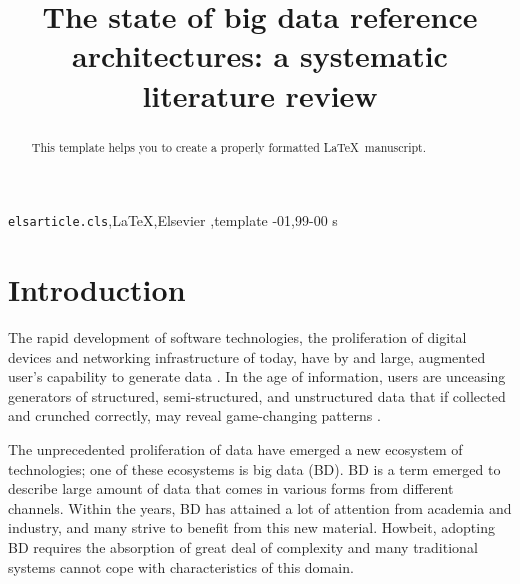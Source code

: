 \documentclass[review]{elsarticle}
\begin{document}
\begin{frontmatter}

\title{The state of big data reference architectures: a systematic literature review}





\begin{abstract}
This template helps you to create a properly formatted \LaTeX\ manuscript.
\end{abstract}

\begin{keyword}
\texttt{elsarticle.cls}\sep \LaTeX\sep Elsevier \sep template
-01\sep  99-00 s
\end{keyword}

\end{frontmatter}

\linenumbers

\section{Introduction}

The rapid development of software technologies, the proliferation of digital devices and networking infrastructure of today, have by and large, augmented user’s capability to generate data \cite{AtaeiSecurity}. In the age of information, users are unceasing generators of structured, semi-structured, and unstructured data that if collected and crunched correctly, may reveal game-changing patterns \cite{AtaeiACIS}.

The unprecedented proliferation of data have emerged a new ecosystem of technologies; one of these ecosystems is big data (BD)\cite{AtaeiHype}. BD is a term emerged to describe large amount of data that comes in various forms from different channels. Within the years, BD has attained a lot of attention from academia and industry, and many strive to benefit from this new material. Howbeit, adopting BD requires the absorption of great deal of complexity and many traditional systems cannot cope with characteristics of this domain. 
\end{document}
